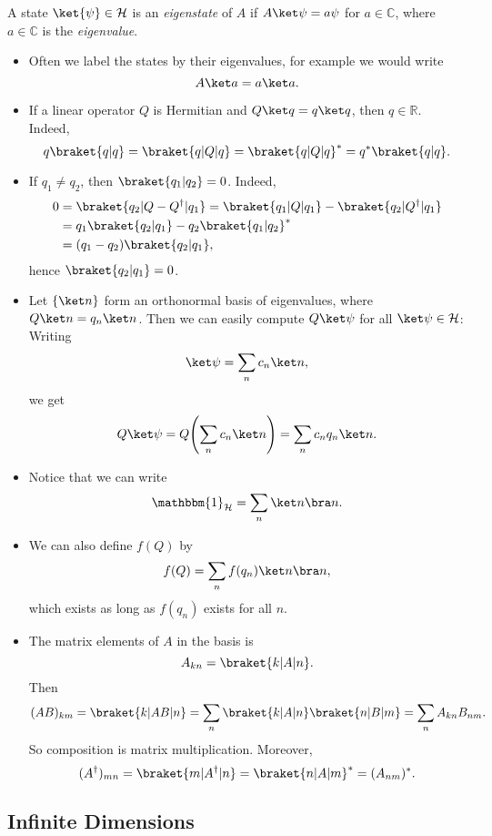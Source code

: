 \documentclass[12pt]{article}
\begin{document}
A state $\ket{\psi} \in \mathcal{H}$ is an \emph{eigenstate} of $A$ if $A \ket \psi = a \psi$ for $a \in \mathbb{C}$, where $a \in \mathbb{C}$ is the \emph{eigenvalue}.
\begin{itemize}
	\item Often we label the states by their eigenvalues, for example we would write
		\[
		A \ket a = a \ket a.
		\]
	\item If a linear operator $Q$ is Hermitian and $Q \ket q = q \ket q$, then $q \in \mathbb{R}$. Indeed,
		\[
			q \braket{q|q} = \braket{q|Q|q} = \braket{q|Q|q}^{\ast} = q^{\ast} \braket{q|q}.
		\]
	\item If $q_1 \neq q_2$, then $\braket{q_1|q_2} = 0$. Indeed, 
		\begin{align*}
			0 &= \braket{q_2|Q-Q^{\dagger}|q_1} = \braket{q_1|Q|q_1} - \braket{q_2|Q^{\dagger}|q_1} \\
			  &= q_1 \braket{q_2|q_1} - q_2 \braket{q_1|q_2}^{\ast} \\
			  &= (q_1 - q_2) \braket{q_2|q_1},
		\end{align*}
		hence $\braket{q_2|q_1} = 0$.
	\item Let $\{\ket n\}$ form an orthonormal basis of eigenvalues, where $Q \ket n = q_n \ket n$. Then we can easily compute $Q \ket \psi$ for all $\ket \psi \in \mathcal{H}$: Writing
		\[
		\ket \psi = \sum_{n} c_n \ket n,
		\]
		we get
		\[
		Q \ket \psi = Q \Biggl( \sum_n c_n \ket n \Biggr) = \sum_n c_n q_n \ket n.
		\]
	\item Notice that we can write
		\[
		\mathbbm{1}_{\mathcal{H}} = \sum_n \ket n \bra n.
		\]
	\item We can also define $f(Q)$ by
		\[
		f(Q) = \sum_n f(q_n) \ket n \bra n,
		\]
		which exists as long as $f(q_n)$ exists for all $n$.
	\item The matrix elements of $A$ in the basis is
		\[
			A_{kn} = \braket{k|A|n}.
		\]
		Then
		\[
			(AB)_{km} = \braket{k|AB|n} = \sum_n \braket{k|A|n} \braket{n|B|m} = \sum_n A_{kn} B_{nm}.
		\]
		So composition is matrix multiplication. Moreover,
		\[
			(A^{\dagger})_{mn} = \braket{m|A^{\dagger}|n} = \braket{n|A|m}^{\ast} = (A_{nm})^{\ast}.
		\]
\end{itemize}

\subsection{Infinite Dimensions}
\label{sub:inf_dim}
\end{document}
